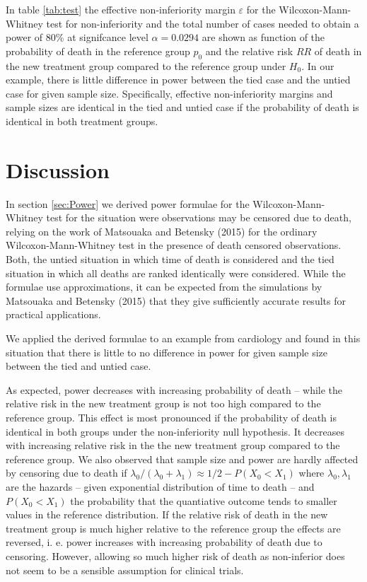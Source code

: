 \documentclass[bimj,fleqn]{w-art}\usepackage[]{graphicx}\usepackage[]{color}
\theoremstyle{plain}
\theoremstyle{definition}
\begin{document}
In table \ref{tab:test} the effective non-inferiority margin $\varepsilon$ for the
Wilcoxon-Mann-Whitney test for non-inferiority and the total number of cases
needed to obtain a power of 80\% at signifcance level $\alpha = 0.0294$ are
shown as function of the probability of death in the reference group $p_0$ and
the relative risk $RR$ of death in the new treatment group compared to the
reference group under $H_0$.
In our example, there is little difference in power between the tied case
and the untied case for given sample size. Specifically, effective
non-inferiority margins and sample sizes are identical in the tied and untied
case if the probability of death is identical in both treatment groups.

\section{Discussion}
\label{sec:Discussion}
In section \ref{sec:Power} we derived power formulae for the Wilcoxon-Mann-Whitney
test for the situation were observations may be censored due to death, relying
on the work of Matsouaka and Betensky (2015) for the ordinary Wilcoxon-Mann-Whitney
test in the presence of death censored observations. Both, the untied situation
in which time of death is considered and the tied situation in which all deaths
are ranked identically were considered. While the formulae use approximations,
it can be expected from the simulations by Matsouaka and Betensky (2015) that they
give  sufficiently accurate results for practical applications.

We applied the derived formulae to an example from cardiology and found in this
situation that there is little to no difference in power for given sample size
between the tied and untied case.

As expected, power decreases with increasing probability of death -- while the
relative risk in the new treatment group is not too high compared to the reference
group. This effect is most pronounced if the probability of death is identical in
both groups under the non-inferiority null hypothesis.
It decreases with increasing relative risk in the the new treatment group compared
to the reference group. We also observed that sample size and power are hardly
affected by censoring due to death if $\lambda_0/(\lambda_0 + \lambda_1) \approx
1/2 - P(X_0 < X_1)$ where $\lambda_0, \lambda_1$ are the hazards -- given
exponential distribution of time to death -- and $P(X_0 < X_1)$ the probability
that the quantiative outcome tends to smaller values in the reference
distribution. If the relative risk of death in the new treatment group is much
higher relative to the reference group the effects are reversed, i. e. power
increases with increasing probability of death due to censoring. However, allowing
so much higher risk of death as non-inferior does not seem to be a sensible
assumption for clinical trials.
\end{document}
